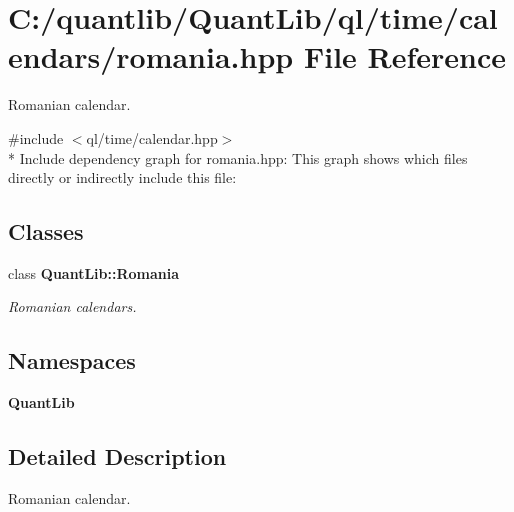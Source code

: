 \section{C\+:/quantlib/\+Quant\+Lib/ql/time/calendars/romania.hpp File Reference}
\label{romania_8hpp}


Romanian calendar.  


{\ttfamily \#include $<$ql/time/calendar.\+hpp$>$}\\*
Include dependency graph for romania.\+hpp\+:
This graph shows which files directly or indirectly include this file\+:
\subsection*{Classes}
\begin{DoxyCompactItemize}
\item 
class {\bf Quant\+Lib\+::\+Romania}
\begin{DoxyCompactList}\small\item\em Romanian calendars. \end{DoxyCompactList}\end{DoxyCompactItemize}
\subsection*{Namespaces}
\begin{DoxyCompactItemize}
\item 
 {\bf Quant\+Lib}
\end{DoxyCompactItemize}


\subsection{Detailed Description}
Romanian calendar. 

